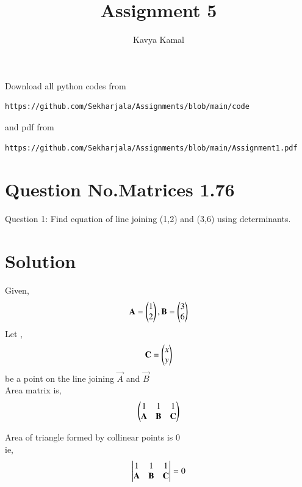 \documentclass[journal,12pt,twocolumn]{IEEEtran}
\begin{document}
     \def\centbox#1{\makebox[0in]{#1}}
     \def\topbox#1{\raisebox{-\baselineskip}[0in][0in]{#1}}
     \def\midbox#1{\raisebox{-0.5\baselineskip}[0in][0in]{#1}}
\vspace{3cm}
\title{Assignment 5}
\author{Kavya Kamal}
\maketitle
\newpage
\bigskip
\renewcommand{\thefigure}{\theenumi}
\renewcommand{\thetable}{\theenumi}
Download all python codes from 
\begin{lstlisting}
https://github.com/Sekharjala/Assignments/blob/main/code
\end{lstlisting}
%
and pdf from 
%
\begin{lstlisting}
https://github.com/Sekharjala/Assignments/blob/main/Assignment1.pdf
\end{lstlisting}
%
\section{Question No.Matrices 1.76}
Question 1:
Find equation of line joining (1,2) and
(3,6) using determinants.
\section{Solution}
Given, 
	\begin{align}
	 \mathbf{A} = \begin{pmatrix}1\\2\end{pmatrix} , \mathbf{B} = \begin{pmatrix}3 \\ 6\end{pmatrix}
	\end{align}
	Let ,
	\begin{align}
	\mathbf{C} = \begin{pmatrix}x\\y\end{pmatrix}
	\end{align}
	be a point on the line joining $\vec{A}$ and $\vec{B}$\\
	Area matrix is,
	\begin{align}
	 \begin{pmatrix}1 & 1& 1 \\
	 \mathbf{A}&\mathbf{B}&\mathbf{C}\end{pmatrix}
	\end{align}

	Area of triangle formed by collinear points is 0\\
	ie,
	\begin{align}
	 \begin{vmatrix}1 & 1& 1 \\
	 \mathbf{A}&\mathbf{B}&\mathbf{C}\end{vmatrix}=0
	\end{align}
\end{document}
